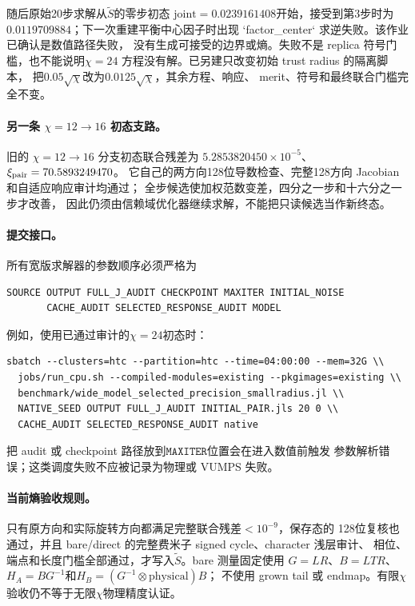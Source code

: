 随后原始20步求解从$\widetilde S$的零步初态
$\mathrm{joint}=0.0239161408$开始，接受到第3步时为
$0.0119709884$；下一次重建平衡中心因子时出现
`factor\_center` 求逆失败。该作业已确认是数值路径失败，
没有生成可接受的边界或熵。失败不是 replica 符号门槛，也不能说明$\chi=24$
方程没有解。已另建只改变初始 trust radius 的隔离脚本，
把$0.05\sqrt{\chi}$改为$0.0125\sqrt{\chi}$，其余方程、响应、
merit、符号和最终联合门槛完全不变。

\paragraph{另一条 $\chi=12\to16$ 初态支路。}
旧的 $\chi=12\to16$ 分支初态联合残差为
$5.2853820450\times10^{-5}$、$\xi_{\rm pair}=70.5893249470$。
它自己的两方向128位导数检查、完整128方向 Jacobian 和自适应响应审计均通过；
全步候选使加权范数变差，四分之一步和十六分之一步才改善，
因此仍须由信赖域优化器继续求解，不能把只读候选当作新终态。

\paragraph{提交接口。}
所有宽版求解器的参数顺序必须严格为
\begin{verbatim}
SOURCE OUTPUT FULL_J_AUDIT CHECKPOINT MAXITER INITIAL_NOISE
       CACHE_AUDIT SELECTED_RESPONSE_AUDIT MODEL
\end{verbatim}
例如，使用已通过审计的$\chi=24$初态时：
\begin{verbatim}
sbatch --clusters=htc --partition=htc --time=04:00:00 --mem=32G \\
  jobs/run_cpu.sh --compiled-modules=existing --pkgimages=existing \\
  benchmark/wide_model_selected_precision_smallradius.jl \\
  NATIVE_SEED OUTPUT FULL_J_AUDIT INITIAL_PAIR.jls 20 0 \\
  CACHE_AUDIT SELECTED_RESPONSE_AUDIT native
\end{verbatim}
把 audit 或 checkpoint 路径放到$\texttt{MAXITER}$位置会在进入数值前触发
参数解析错误；这类调度失败不应被记录为物理或 VUMPS 失败。

\paragraph{当前熵验收规则。}
只有原方向和实际旋转方向都满足完整联合残差$<10^{-9}$，保存态的
128位复核也通过，并且 bare/direct 的完整费米子 signed cycle、character 浅层审计、
相位、端点和长度门槛全部通过，才写入$\widetilde S$。bare 测量固定使用
$G=LR$、$B=LTR$、$H_A=BG^{-1}$和$H_B=(G^{-1}\otimes\text{physical})B$；
不使用 grown tail 或 endmap。有限$\chi$验收仍不等于无限$\chi$物理精度认证。
